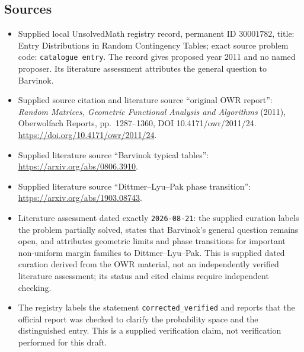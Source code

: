 \documentclass[11pt]{article}
\begin{document}
\subsection{Sources}
\begin{itemize}
\item Supplied local UnsolvedMath registry record, permanent ID \(30001782\), title: Entry Distributions in Random Contingency Tables; exact source problem code: \texttt{catalogue entry}. The record gives proposed year 2011 and no named proposer. Its literature assessment attributes the general question to Barvinok.
\item Supplied source citation and literature source ``original OWR report'': \emph{Random Matrices, Geometric Functional Analysis and Algorithms} (2011), Oberwolfach Reports, pp.\ 1287--1360, DOI 10.4171/owr/2011/24. \url{https://doi.org/10.4171/owr/2011/24}.
\item Supplied literature source ``Barvinok typical tables'': \url{https://arxiv.org/abs/0806.3910}.
\item Supplied literature source ``Dittmer--Lyu--Pak phase transition'': \url{https://arxiv.org/abs/1903.08743}.
\item Literature assessment dated exactly \texttt{2026-08-21}: the supplied curation labels the problem partially solved, states that Barvinok's general question remains open, and attributes geometric limits and phase transitions for important non-uniform margin families to Dittmer--Lyu--Pak. This is supplied dated curation derived from the OWR material, not an independently verified literature assessment; its status and cited claims require independent checking.
\item The registry labels the statement \texttt{corrected\_verified} and reports that the official report was checked to clarify the probability space and the distinguished entry. This is a supplied verification claim, not verification performed for this draft.
\end{itemize}
\end{document}
